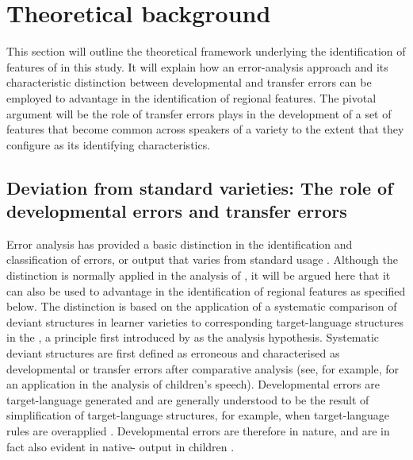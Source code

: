 \documentclass[output=paper]{langsci/langscibook}
\begin{document}
\section{Theoretical background}

This section will outline the theoretical framework underlying the
identification of features of  in this study. It will
explain how an error-analysis approach and its characteristic
distinction between developmental and transfer errors can be employed
to advantage in the identification of regional features. The pivotal
argument will be the role  of transfer errors plays in
the development of a set of features that become common across
speakers of a variety to the extent that they configure as its
identifying characteristics.


\subsection{Deviation from standard varieties: The role of developmental errors and transfer errors}
\label{sec:key:2.1}

Error analysis has provided a basic distinction in the identification and classification
of errors, or output that varies from standard usage
\citep{Corder1974}. Although the distinction is normally applied in
the analysis of , it will be argued here that it can
also be used to advantage in the identification of regional features
as specified below. The distinction is based on the application of a
systematic comparison of deviant structures in learner varieties to
corresponding target-language structures in the , a
principle first introduced by \citet{Lado1957} as the 
analysis hypothesis. Systematic deviant structures are first defined 
as erroneous and 
characterised as developmental or transfer errors after comparative analysis (see, for example,
\citealt{DulayBurt1974} for an application
in the
analysis of  children’s speech). Developmental errors are
target-language generated \citep[173]{Richards1974} and are generally
understood to be the result of simplification of target-language
structures, for example, when target-language rules are overapplied
\citep{Jain1974}. Developmental errors are therefore  in
nature, and are in fact also evident in native- output in
children \citep{Jain1974}.
\end{document}
